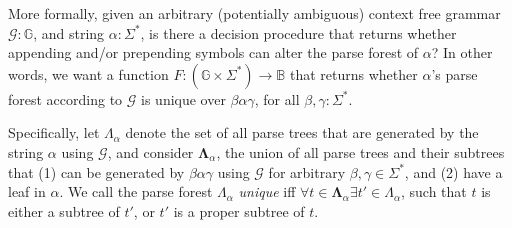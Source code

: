 \documentclass[sigplan,review,anonymous,acmsmall]{acmart}\settopmatter{printfolios=false,printccs=false,printacmref=false}
\begin{document}
More formally, given an arbitrary (potentially ambiguous) context free grammar $\mathcal{G}: \mathbb{G}$, and string $\alpha: \Sigma^\ast$, is there a decision procedure that returns whether appending and/or prepending symbols can alter the parse forest of $\alpha$? In other words, we want a function $F: (\mathbb{G} \times \Sigma^\ast) \rightarrow \mathbb{B}$ that returns whether $\alpha$'s parse forest according to $\mathcal{G}$ is unique over $\beta\alpha\gamma$, for all $\beta, \gamma: \Sigma^\ast$.

Specifically, let $\Lambda_\alpha$ denote the set of all parse trees that are generated by the string $\alpha$ using $\mathcal{G}$, and consider $\bm\Lambda_{\alpha}$, the union of all parse trees and their subtrees that (1) can be generated by $\beta\alpha\gamma$ using $\mathcal{G}$ for arbitrary $\beta, \gamma \in \Sigma^\ast$, and (2) have a leaf in $\alpha$. We call the parse forest $\Lambda_\alpha$ \textit{unique} iff $\forall t \in \bm\Lambda_{\alpha}\exists t' \in \Lambda_\alpha$, such that $t$ is either a subtree of $t'$, or $t'$ is a proper subtree of $t$.
\end{document}
